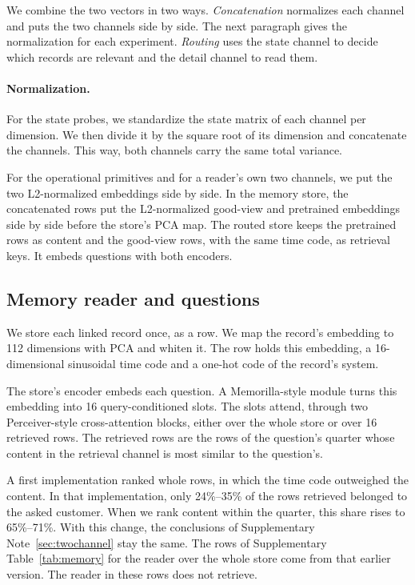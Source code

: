 \documentclass[11pt]{article}
\begin{document}
We combine the two vectors in two ways. \emph{Concatenation} normalizes each channel and puts the two channels side by side. The next paragraph gives the normalization for each experiment. \emph{Routing} uses the state channel to decide which records are relevant and the detail channel to read them.

\paragraph{Normalization.} For the state probes, we standardize the state matrix of each channel per dimension. We then divide it by the square root of its dimension and concatenate the channels. This way, both channels carry the same total variance.

For the operational primitives and for a reader's own two channels, we put the two L2-normalized embeddings side by side. In the memory store, the concatenated rows put the L2-normalized good-view and pretrained embeddings side by side before the store's PCA map. The routed store keeps the pretrained rows as content and the good-view rows, with the same time code, as retrieval keys. It embeds questions with both encoders.

\subsection{Memory reader and questions}
We store each linked record once, as a row. We map the record's embedding to 112 dimensions with PCA and whiten it. The row holds this embedding, a 16-dimensional sinusoidal time code and a one-hot code of the record's system.

The store's encoder embeds each question. A Memorilla-style module\citep{fallahpour2026memorilla} turns this embedding into 16 query-conditioned slots. The slots attend, through two Perceiver-style cross-attention blocks, either over the whole store or over 16 retrieved rows. The retrieved rows are the rows of the question's quarter whose content in the retrieval channel is most similar to the question's.

A first implementation ranked whole rows, in which the time code outweighed the content. In that implementation, only 24\%--35\% of the rows retrieved belonged to the asked customer. When we rank content within the quarter, this share rises to 65\%--71\%. With this change, the conclusions of Supplementary Note~\ref{sec:twochannel} stay the same. The rows of Supplementary Table~\ref{tab:memory} for the reader over the whole store come from that earlier version. The reader in these rows does not retrieve.
\end{document}
